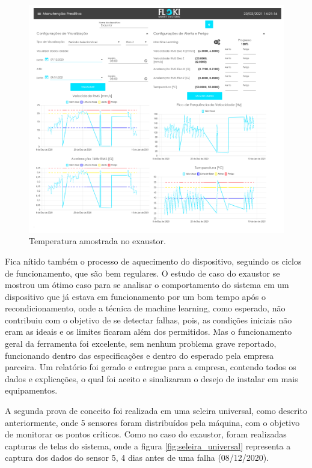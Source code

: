 \begin{figure}[H]
    \caption{Temperatura amostrada no exaustor.}
    \begin{center}
        \includegraphics[scale=0.65, page=3]{resultados/img/resultados.pdf}
    \end{center}
    \label{fig:exaustor_temperatura}
\end{figure}

Fica nítido também o processo de aquecimento do dispositivo, seguindo os ciclos de funcionamento, que são bem regulares. O estudo de caso do 
exaustor se mostrou um ótimo caso para se analisar o comportamento do sistema em um dispositivo que já estava em funcionamento por um bom tempo 
após o recondicionamento, onde a técnica de machine learning, como esperado, não contribuiu com o objetivo de se detectar falhas, pois, as
condições iniciais não eram as ideais e os limites ficaram além dos permitidos. Mas o funcionamento geral da ferramenta foi excelente, sem nenhum
problema grave reportado, funcionando dentro das especificações e dentro do esperado pela empresa parceira. Um relatório foi gerado e entregue
para a empresa, contendo todos os dados e explicações, o qual foi aceito e sinalizaram o desejo de instalar em mais equipamentos.

A segunda prova de conceito foi realizada em uma seleira universal, como descrito anteriormente, onde 5 sensores foram distribuídos pela máquina, com o 
objetivo de monitorar os pontos críticos. Como no caso do exaustor, foram realizadas capturas de telas do sistema, onde a figura
\ref{fig:seleira_universal} representa a captura dos dados do sensor 5, 4 dias antes de uma falha (08/12/2020). 

